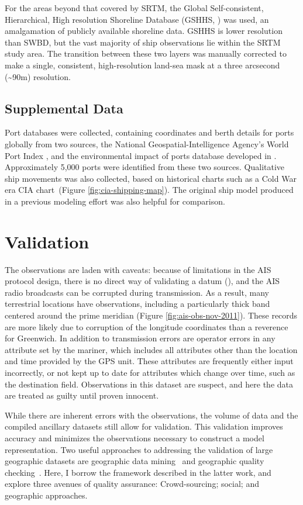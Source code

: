 For the areas beyond that covered by SRTM, the Global Self-consistent, Hierarchical, High resolution Shoreline Database (GSHHS, \citealp{wessel1996global}) was used, an amalgamation of publicly available shoreline data. GSHHS is lower resolution than SWBD, but the vast majority of ship observations lie within the SRTM study area. The transition between these two layers was manually corrected to make a single, consistent, high-resolution land-sea mask at a three arcsecond (\textasciitilde{}90m) resolution.

\subsection{Supplemental Data}
Port databases were collected, containing coordinates and berth details for ports globally from two sources, the National Geospatial-Intelligence Agency's World Port Index \citep{worldportindex}, and the environmental impact of ports database developed in \cite{Halpern2008}. Approximately 5,000 ports were identified from these two sources.  Qualitative ship movements was also collected, based on historical charts such as a Cold War era CIA chart~(Figure \ref{fig:cia-shipping-map}). The original ship model produced in a previous modeling effort \citep{Halpern2008} was also helpful for comparison.

\section{Validation}
The observations are laden with caveats: because of limitations in the AIS protocol design, there is no direct way of validating a datum (\citeauthor*{RaymondInPress}), and the AIS radio broadcasts can be corrupted during transmission. As a result, many terrestrial locations have observations, including a particularly thick band centered around the prime meridian (Figure \ref{fig:ais-obs-nov-2011}). These records are more likely due to corruption of the longitude coordinates than a reverence for Greenwich. In addition to transmission errors are operator errors in any attribute set by the mariner, which includes all attributes other than the location and time provided by the GPS unit. These attributes are frequently either input incorrectly, or not kept up to date for attributes which change over time, such as the destination field. Observations in this dataset are suspect, and here the data are treated as guilty until proven innocent.

While there are inherent errors with the observations, the volume of data and the compiled ancillary datasets still allow for validation. This validation improves accuracy and minimizes the observations necessary to construct a model representation. Two useful approaches to addressing the validation of large geographic datasets are geographic data mining~\citep{miller2009geographic} and geographic quality checking~\cite{goodchildli2012}. Here, I borrow the framework described in the latter work, and explore three avenues of quality assurance: Crowd-sourcing; social; and geographic approaches.

